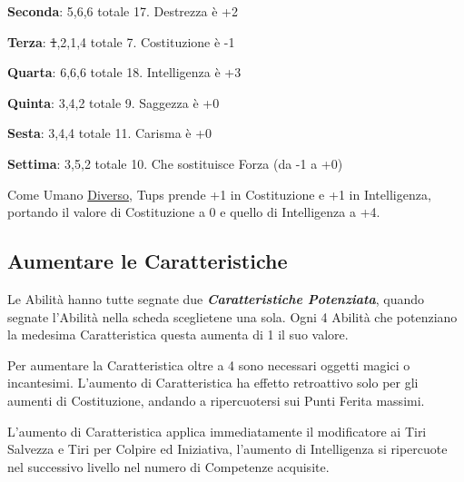\begin{multicols}{2}
\begin{changemargin}{0.3cm}{0.3cm}
\begin{tcolorbox}[title = Tiriamo le Caratteristiche di Tups]
		\textbf{Seconda}: 5,6,6 totale 17. Destrezza è +2

		\textbf{Terza}: \st{1},2,1,4 totale 7. Costituzione è -1

		\textbf{Quarta}: 6,6,6 totale 18. Intelligenza è +3

		\textbf{Quinta}: 3,4,2 totale 9. Saggezza è +0

		\textbf{Sesta}: 3,4,4 totale 11. Carisma è +0

		\textbf{Settima}: 3,5,2 totale 10. Che sostituisce Forza (da -1 a +0)

		Come Umano \hyperlink{diverso}{Diverso}, Tups prende +1 in Costituzione e +1 in Intelligenza, portando il valore di Costituzione a 0 e quello di Intelligenza a +4.

\end{tcolorbox}\end{changemargin}


\subsection{Aumentare le Caratteristiche}\label{aumentarelecaratteristiche}\hypertarget{aumentarelecaratteristiche}{}

Le Abilità hanno tutte segnate due \emph{\textbf{Caratteristiche Potenziata}}, quando segnate l'Abilità nella scheda sceglietene una sola. Ogni 4 Abilità che potenziano la medesima Caratteristica questa aumenta di 1 il suo valore.

Per aumentare la Caratteristica oltre a 4 sono necessari oggetti magici o incantesimi. L'aumento di Caratteristica ha effetto retroattivo solo per gli aumenti di Costituzione, andando a ripercuotersi sui Punti Ferita massimi.

L'aumento di Caratteristica applica immediatamente il modificatore ai Tiri Salvezza e Tiri per Colpire ed Iniziativa, l'aumento di Intelligenza si ripercuote nel successivo livello nel numero di Competenze acquisite.




\medskip


\end{multicols}
